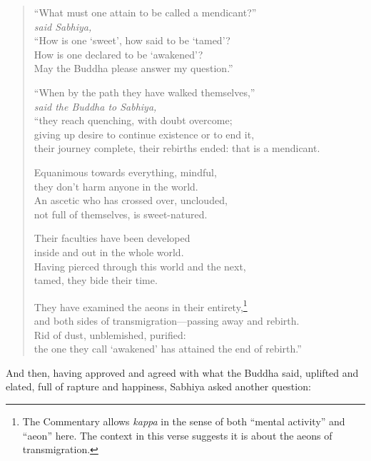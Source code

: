 \documentclass[12pt,openany]{book}%
\newcommand*{\scspeaker}[1]{\hspace{2em}\textit{#1}}
\begin{document}
\begin{verse}%
“What must one attain to be called a mendicant?” \\
\scspeaker{said Sabhiya, }\\
“How is one ‘sweet’, how said to be ‘tamed’? \\
How is one declared to be ‘awakened’? \\
May the Buddha please answer my question.” 

“When by the path they have walked themselves,” \\
\scspeaker{said the Buddha to Sabhiya, }\\
“they reach quenching, with doubt overcome; \\
giving up desire to continue existence or to end it, \\
their journey complete, their rebirths ended: that is a mendicant. 

Equanimous towards everything, mindful, \\
they don’t harm anyone in the world. \\
An ascetic who has crossed over, unclouded, \\
not full of themselves, is sweet-natured. 

Their faculties have been developed \\
inside and out in the whole world. \\
Having pierced through this world and the next, \\
tamed, they bide their time. 

They have examined the aeons in their entirety,\footnote{The Commentary allows \textit{kappa} in the sense of both “mental activity” and “aeon” here. The context in this verse suggests it is about the aeons of transmigration. } \\
and both sides of transmigration—passing away and rebirth. \\
Rid of dust, unblemished, purified: \\
the one they call ‘awakened’ has attained the end of rebirth.” 

%
\end{verse}

And then, having approved and agreed with what the Buddha said, uplifted and elated, full of rapture and happiness, Sabhiya asked another question: 
\end{document}
